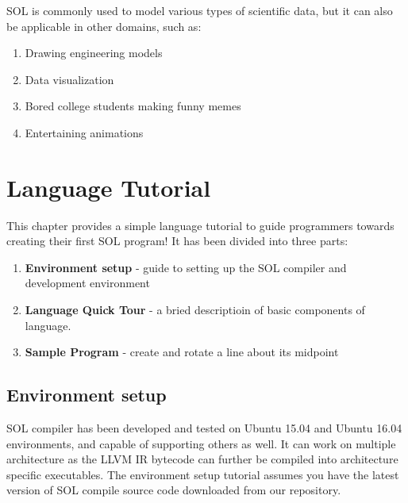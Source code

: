 \documentclass[letterpaper,12pt]{report}
\begin{document}
  SOL is commonly used to model various types of scientific data, but it can also be applicable in other domains, such as:
  \begin{enumerate}
    \itemsep 0em
    \item Drawing engineering models
    \item Data visualization
    \item Bored college students making funny memes
    \item Entertaining animations
  \end{enumerate}

\chapter{Language Tutorial}
  This chapter provides a simple language tutorial to guide programmers towards creating their first SOL program! It has been divided into three parts:
  \begin{enumerate}
    \item \textbf{Environment setup} - guide to setting up the SOL compiler and development environment
    \item \textbf{Language Quick Tour} - a bried descriptioin of basic components of language.
    \item \textbf{Sample Program} - create and rotate a line about its midpoint
  \end{enumerate}

  \section{Environment setup}
  SOL compiler has been developed and tested on Ubuntu 15.04 and Ubuntu 16.04 environments, and capable of supporting others as well. It can work on multiple architecture as the LLVM IR bytecode can further be compiled into architecture specific executables. The environment setup tutorial assumes you have the latest version of SOL compile source code downloaded from our repository.
\end{document}
